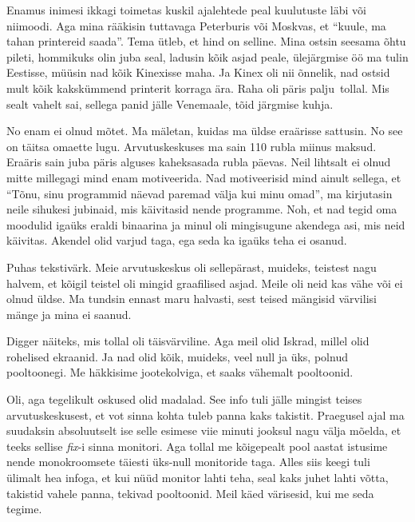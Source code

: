 Enamus inimesi ikkagi toimetas kuskil ajalehtede peal kuulutuste läbi või niimoodi. Aga mina  rääkisin tuttavaga Peterburis või Moskvas, et \enquote{kuule,  ma tahan printereid saada}. Tema ütleb, et hind on selline. Mina ostsin seesama õhtu pileti, hommikuks olin juba seal, ladusin kõik asjad peale, ülejärgmise öö ma tulin Eestisse, müüsin nad kõik Kinexisse maha. Ja Kinex oli nii õnnelik, nad ostsid mult kõik kakskümmend printerit korraga ära. Raha oli päris palju tollal. Mis sealt vahelt sai, sellega panid jälle Venemaale, tõid järgmise kuhja.


No enam ei olnud mõtet. Ma mäletan, kuidas ma üldse eraärisse sattusin. No see on täitsa omaette lugu. Arvutuskeskuses ma sain 110 rubla miinus maksud. Eraäris sain juba päris alguses kaheksasada rubla päevas. Neil lihtsalt ei olnud mitte millegagi mind enam motiveerida. Nad motiveerisid mind ainult sellega, et \enquote{Tõnu, sinu programmid näevad paremad välja kui minu omad}, ma kirjutasin neile sihukesi jubinaid, mis käivitasid nende programme. Noh, et nad tegid oma moodulid igaüks eraldi binaarina ja minul oli mingisugune akendega asi, mis neid käivitas. Akendel olid varjud taga, ega seda ka igaüks teha ei osanud. 


Puhas tekstivärk. Meie arvutuskeskus oli sellepärast, muideks,  teistest  nagu halvem, et kõigil teistel oli mingid graafilised asjad. Meile oli neid kas vähe või ei olnud üldse. Ma tundsin ennast maru halvasti, sest teised mängisid värvilisi mänge ja mina ei saanud. 


Digger näiteks, mis tollal oli täisvärviline. Aga meil olid Iskrad, millel olid rohelised ekraanid. Ja nad olid kõik, muideks, veel null ja üks, polnud  pooltoonegi. Me häkkisime  jootekolviga, et saaks  vähemalt pooltoonid. 


Oli, aga tegelikult oskused olid madalad.  See info tuli  jälle mingist teises arvutuskeskusest, et vot sinna kohta tuleb panna kaks takistit. Praegusel ajal ma suudaksin absoluutselt ise selle esimese viie minuti jooksul nagu välja mõelda, et teeks sellise \emph{fix}-i sinna monitori. Aga tollal me kõigepealt pool aastat istusime nende monokroomsete täiesti üks-null monitoride taga. Alles siis keegi tuli ülimalt hea infoga, et kui nüüd monitor lahti teha, seal kaks juhet lahti võtta, takistid vahele panna, tekivad pooltoonid. Meil käed värisesid, kui me seda tegime. 

